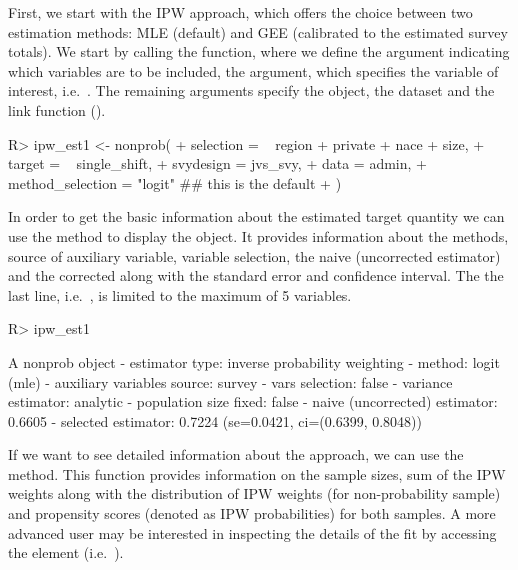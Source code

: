 \documentclass[
]{jss}
\begin{document}
First, we start with the IPW approach, which offers the choice between
two estimation methods: MLE (default) and GEE (calibrated to the
estimated survey totals). We start by calling the 
function, where we define the  argument indicating which
variables are to be included, the  argument, which
specifies the variable of interest, i.e.~. The
remaining arguments specify the  object, the dataset and
the link function ().

\begin{CodeChunk}
\begin{CodeInput}
R> ipw_est1 <- nonprob(
+   selection = ~ region + private + nace + size,
+   target = ~ single_shift,
+   svydesign = jvs_svy,
+   data = admin,
+   method_selection = "logit" ## this is the default
+ )
\end{CodeInput}
\end{CodeChunk}

In order to get the basic information about the estimated target
quantity we can use the  method to display the object. It
provides information about the methods, source of auxiliary variable,
variable selection, the naive (uncorrected estimator) and the corrected
along with the standard error and confidence interval. The the last
line, i.e.~, is limited to the maximum of 5
variables.

\begin{CodeChunk}
\begin{CodeInput}
R> ipw_est1
\end{CodeInput}
\begin{CodeOutput}
A nonprob object
 - estimator type: inverse probability weighting
 - method: logit (mle)
 - auxiliary variables source: survey
 - vars selection: false
 - variance estimator: analytic
 - population size fixed: false
 - naive (uncorrected) estimator: 0.6605
 - selected estimator: 0.7224 (se=0.0421, ci=(0.6399, 0.8048))
\end{CodeOutput}
\end{CodeChunk}

If we want to see detailed information about the approach, we can use
the  method. This function provides information on the
sample sizes, sum of the IPW weights along with the distribution of IPW
weights (for non-probability sample) and propensity scores (denoted as
IPW probabilities) for both samples. A more advanced user may be
interested in inspecting the details of the fit by accessing the
 element (i.e.~).
\end{document}

